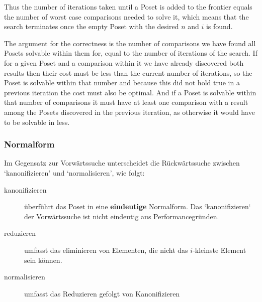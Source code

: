 \documentclass[10pt,journal,compsoc]{IEEEtran}
\begin{document}
Thus the number of iterations taken until a Poset is added to the frontier equals the number of
worst case comparisons needed to solve it, which means that the search terminates once the empty
Poset with the desired $n$ and $i$ is found.

The argument for the correctness is the number of comparisons we have found all Posets solvable
within them for, equal to the number of iterations of the search. If for a given Poset and a
comparison within it we have already discovered both results then their cost must be less than the
current number of iterations, so the Poset is solvable within that number and because this did not
hold true in a previous iteration the cost must also be optimal. And if a Poset is solvable within
that number of comparisons it must have at least one comparison with a result among the Posets
discovered in the previous iteration, as otherwise it would have to be solvable in less.

\subsubsection{Normalform}
Im Gegensatz zur Vorwärtssuche unterscheidet die Rückwärtssuche zwischen `kanonifizieren' und `normalisieren', wie folgt:
\begin{description}
  \item[kanonifizieren]
    überführt das Poset in eine \textbf{eindeutige} Normalform.
    Das `kanonifizieren` der Vorwärtssuche ist nicht eindeutig aus Performancegründen.
  \item[reduzieren]
    umfasst das eliminieren von Elementen, die nicht das $i$-kleinste Element sein können.
  \item[normalisieren]
    umfasst das Reduzieren gefolgt von Kanonifizieren
\end{description}
\end{document}
